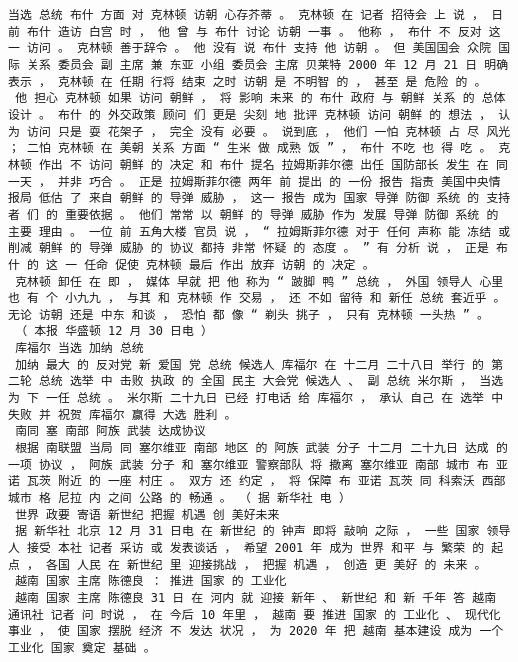 \documentclass{article}
\begin{document}
\begin{Verbatim}[commandchars=\\\{\}]
 当选 总统 布什 方面 对 克林顿 访朝 心存芥蒂 。 克林顿 在 记者 招待会 上 说 ， 日前 布什 造访 白宫 时 ， 他 曾 与 布什 讨论 访朝 一事 。 他称 ， 布什 不 反对 这一 访问 。 克林顿 善于辞令 。 他 没有 说 布什 支持 他 访朝 。 但 美国国会 众院 国际 关系 委员会 副 主席 兼 东亚 小组 委员会 主席 贝莱特 2000 年 12 月 21 日 明确 表示 ， 克林顿 在 任期 行将 结束 之时 访朝 是 不明智 的 ， 甚至 是 危险 的 。 
 他 担心 克林顿 如果 访问 朝鲜 ， 将 影响 未来 的 布什 政府 与 朝鲜 关系 的 总体设计 。 布什 的 外交政策 顾问 们 更是 尖刻 地 批评 克林顿 访问 朝鲜 的 想法 ， 认为 访问 只是 耍 花架子 ， 完全 没有 必要 。 说到底 ， 他们 一怕 克林顿 占 尽 风光 ； 二怕 克林顿 在 美朝 关系 方面 “ 生米 做 成熟 饭 ” ， 布什 不吃 也 得 吃 。 克林顿 作出 不 访问 朝鲜 的 决定 和 布什 提名 拉姆斯菲尔德 出任 国防部长 发生 在 同一天 ， 并非 巧合 。 正是 拉姆斯菲尔德 两年 前 提出 的 一份 报告 指责 美国中央情报局 低估 了 来自 朝鲜 的 导弹 威胁 ， 这一 报告 成为 国家 导弹 防御 系统 的 支持者 们 的 重要依据 。 他们 常常 以 朝鲜 的 导弹 威胁 作为 发展 导弹 防御 系统 的 主要 理由 。 一位 前 五角大楼 官员 说 ， “ 拉姆斯菲尔德 对于 任何 声称 能 冻结 或 削减 朝鲜 的 导弹 威胁 的 协议 都持 非常 怀疑 的 态度 。 ” 有 分析 说 ， 正是 布什 的 这 一 任命 促使 克林顿 最后 作出 放弃 访朝 的 决定 。 
 克林顿 卸任 在 即 ， 媒体 早就 把 他 称为 “ 跛脚 鸭 ” 总统 ， 外国 领导人 心里 也 有 个 小九九 ， 与其 和 克林顿 作 交易 ， 还 不如 留待 和 新任 总统 套近乎 。 无论 访朝 还是 中东 和谈 ， 恐怕 都 像 “ 剃头 挑子 ， 只有 克林顿 一头热 ” 。 
 （ 本报 华盛顿 12 月 30 日电 ） 
 库福尔 当选 加纳 总统 
 加纳 最大 的 反对党 新 爱国 党 总统 候选人 库福尔 在 十二月 二十八日 举行 的 第二轮 总统 选举 中 击败 执政 的 全国 民主 大会党 候选人 、 副 总统 米尔斯 ， 当选 为 下 一任 总统 。 米尔斯 二十九日 已经 打电话 给 库福尔 ， 承认 自己 在 选举 中 失败 并 祝贺 库福尔 赢得 大选 胜利 。 
 南同 塞 南部 阿族 武装 达成协议 
 根据 南联盟 当局 同 塞尔维亚 南部 地区 的 阿族 武装 分子 十二月 二十九日 达成 的 一项 协议 ， 阿族 武装 分子 和 塞尔维亚 警察部队 将 撤离 塞尔维亚 南部 城市 布 亚诺 瓦茨 附近 的 一座 村庄 。 双方 还 约定 ， 将 保障 布 亚诺 瓦茨 同 科索沃 西部 城市 格 尼拉 内 之间 公路 的 畅通 。 （ 据 新华社 电 ） 
 世界 政要 寄语 新世纪 把握 机遇 创 美好未来 
 据 新华社 北京 12 月 31 日电 在 新世纪 的 钟声 即将 敲响 之际 ， 一些 国家 领导人 接受 本社 记者 采访 或 发表谈话 ， 希望 2001 年 成为 世界 和平 与 繁荣 的 起点 ， 各国 人民 在 新世纪 里 迎接挑战 ， 把握 机遇 ， 创造 更 美好 的 未来 。 
 越南 国家 主席 陈德良 ： 推进 国家 的 工业化 
 越南 国家 主席 陈德良 31 日 在 河内 就 迎接 新年 、 新世纪 和 新 千年 答 越南 通讯社 记者 问 时说 ， 在 今后 10 年里 ， 越南 要 推进 国家 的 工业化 、 现代化 事业 ， 使 国家 摆脱 经济 不 发达 状况 ， 为 2020 年 把 越南 基本建设 成为 一个 工业化 国家 奠定 基础 。 

\end{Verbatim}
\end{document}
